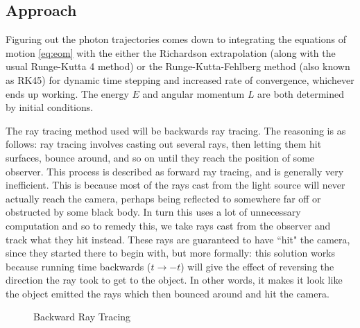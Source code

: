 \documentclass{article}
\begin{document}
\subsection*{Approach}
Figuring out the photon trajectories comes down to integrating the equations of motion \ref{eq:eom} with the either the Richardson extrapolation \cite{Richardson extrapolation} (along with the usual Runge-Kutta 4 method) or the Runge-Kutta-Fehlberg method (also known as RK45) for dynamic time stepping and increased rate of convergence, whichever ends up working. The energy \(E\) and angular momentum \(L\) are both determined by initial conditions. 

The ray tracing method used will be backwards ray tracing. The reasoning is as follows: ray tracing involves casting out several rays, then letting them hit surfaces, bounce around, and so on until they reach the position of some observer. This process is described as forward ray tracing, and is generally very inefficient. This is because most of the rays cast from the light source will never actually reach the camera, perhaps being reflected to somewhere far off or obstructed by some black body. In turn this uses a lot of unnecessary computation and so to remedy this, we take rays cast from the observer and track what they hit instead. These rays are guaranteed to have ``hit" the camera, since they started there to begin with, but more formally: this solution works because running time backwards (\(t\to -t\)) will give the effect of reversing the direction the ray took to get to the object. In other words, it makes it look like the object emitted the rays which then bounced around and hit the camera.

\begin{figure}[H]
	\centering
	\caption{Backward Ray Tracing}
\end{figure}
\end{document}
